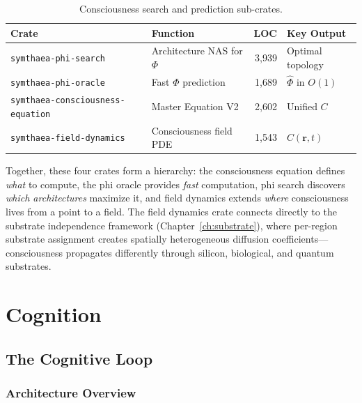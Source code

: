 \documentclass[12pt]{book}
\begin{document}
\begin{table}[htbp]
\centering
\caption{Consciousness search and prediction sub-crates.}
\label{tab:phi-crates}
\begin{tabular}{llrl}
\toprule
\textbf{Crate} & \textbf{Function} & \textbf{LOC} & \textbf{Key Output} \\
\midrule
\texttt{symthaea-phi-search} & Architecture NAS for $\Phi$ & 3,939 & Optimal topology \\
\texttt{symthaea-phi-oracle} & Fast $\Phi$ prediction & 1,689 & $\hat{\Phi}$ in $O(1)$ \\
\texttt{symthaea-consciousness-equation} & Master Equation V2 & 2,602 & Unified $C$ \\
\texttt{symthaea-field-dynamics} & Consciousness field PDE & 1,543 & $C(\mathbf{r}, t)$ \\
\bottomrule
\end{tabular}
\end{table}

Together, these four crates form a hierarchy: the consciousness equation defines \textit{what} to compute, the phi oracle provides \textit{fast} computation, phi search discovers \textit{which architectures} maximize it, and field dynamics extends \textit{where} consciousness lives from a point to a field. The field dynamics crate connects directly to the substrate independence framework (Chapter~\ref{ch:substrate}), where per-region substrate assignment creates spatially heterogeneous diffusion coefficients---consciousness propagates differently through silicon, biological, and quantum substrates.



\part{Cognition}

\chapter{The Cognitive Loop}
\label{ch:loop}

\section{Architecture Overview}
\end{document}

